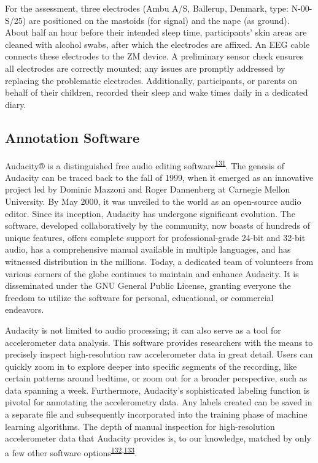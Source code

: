 \documentclass[
  10pt,
]{scrbook}
\begin{document}
For the assessment, three electrodes (Ambu A/S, Ballerup, Denmark, type:
N-00-S/25) are positioned on the mastoids (for signal) and the nape (as
ground). About half an hour before their intended sleep time,
participants' skin areas are cleaned with alcohol swabs, after which the
electrodes are affixed. An EEG cable connects these electrodes to the ZM
device. A preliminary sensor check ensures all electrodes are correctly
mounted; any issues are promptly addressed by replacing the problematic
electrodes. Additionally, participants, or parents on behalf of their
children, recorded their sleep and wake times daily in a dedicated
diary.

\hypertarget{annotation-software}{%
\subsection{Annotation Software}\label{annotation-software}}

Audacity®️ is a distinguished free audio editing
software\textsuperscript{\protect\hyperlink{ref-audacity}{131}}. The
genesis of Audacity can be traced back to the fall of 1999, when it
emerged as an innovative project led by Dominic Mazzoni and Roger
Dannenberg at Carnegie Mellon University. By May 2000, it was unveiled
to the world as an open-source audio editor. Since its inception,
Audacity has undergone significant evolution. The software, developed
collaboratively by the community, now boasts of hundreds of unique
features, offers complete support for professional-grade 24-bit and
32-bit audio, has a comprehensive manual available in multiple
languages, and has witnessed distribution in the millions. Today, a
dedicated team of volunteers from various corners of the globe continues
to maintain and enhance Audacity. It is disseminated under the GNU
General Public License, granting everyone the freedom to utilize the
software for personal, educational, or commercial endeavors.

Audacity is not limited to audio processing; it can also serve as a tool
for accelerometer data analysis. This software provides researchers with
the means to precisely inspect high-resolution raw accelerometer data in
great detail. Users can quickly zoom in to explore deeper into specific
segments of the recording, like certain patterns around bedtime, or zoom
out for a broader perspective, such as data spanning a week.
Furthermore, Audacity's sophisticated labeling function is pivotal for
annotating the accelerometry data. Any labels created can be saved in a
separate file and subsequently incorporated into the training phase of
machine learning algorithms. The depth of manual inspection for
high-resolution accelerometer data that Audacity provides is, to our
knowledge, matched by only a few other software
options\textsuperscript{\protect\hyperlink{ref-visplore}{132},\protect\hyperlink{ref-label_studio}{133}}.
\end{document}
